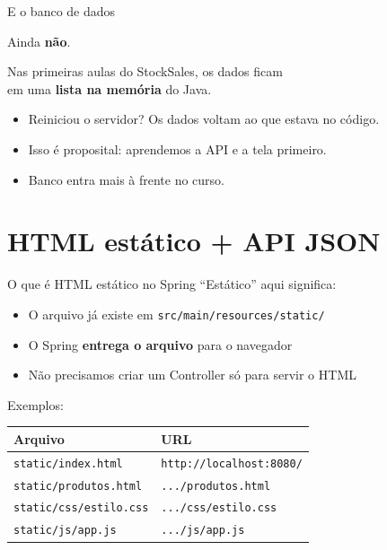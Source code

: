 \documentclass[aspectratio=169,11pt]{beamer}
\begin{document}
\begin{frame}{E o banco de dados}
  \begin{center}
    \Large Ainda \textbf{não}.
  \end{center}

  \vspace{0.8em}
  Nas primeiras aulas do StockSales, os dados ficam\\
  em uma \textbf{lista na memória} do Java.

  \vspace{0.6em}
  \begin{itemize}
    \item Reiniciou o servidor? Os dados voltam ao que estava no código.
    \item Isso é proposital: aprendemos a API e a tela primeiro.
    \item Banco entra mais à frente no curso.
  \end{itemize}
\end{frame}

\section{HTML estático + API JSON}

\begin{frame}{O que é HTML estático no Spring}
  ``Estático'' aqui significa:

  \vspace{0.5em}
  \begin{itemize}
    \item O arquivo já existe em \texttt{src/main/resources/static/}
    \item O Spring \textbf{entrega o arquivo} para o navegador
    \item Não precisamos criar um Controller só para servir o HTML
  \end{itemize}

  \vspace{0.8em}
  Exemplos:

  \begin{center}
  \begin{tabular}{ll}
    \toprule
    Arquivo & URL \\
    \midrule
    \texttt{static/index.html} & \texttt{http://localhost:8080/} \\
    \texttt{static/produtos.html} & \texttt{.../produtos.html} \\
    \texttt{static/css/estilo.css} & \texttt{.../css/estilo.css} \\
    \texttt{static/js/app.js} & \texttt{.../js/app.js} \\
    \bottomrule
  \end{tabular}
  \end{center}
\end{frame}
\end{document}
